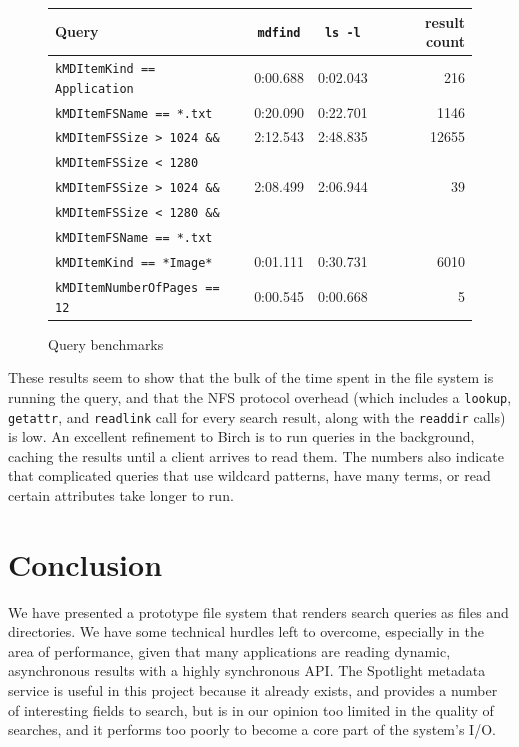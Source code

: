 \documentclass{article}
\begin{document}
\begin{figure}[ht!]
\begin{center}
\begin{tabular}{|l|c|c|r|} \hline
 \textbf{Query} & \texttt{mdfind}   & \texttt{ls -l} & \textbf{result count} \\ \hline \hline
\texttt{kMDItemKind == Application} & 0:00.688 & 0:02.043 &   216 \\ \hline
\texttt{kMDItemFSName == *.txt}     & 0:20.090 & 0:22.701 &  1146 \\ \hline
\texttt{kMDItemFSSize > 1024 \&\&}  & 2:12.543 & 2:48.835 & 12655 \\
\texttt{kMDItemFSSize < 1280}       &          &          &       \\ \hline
\texttt{kMDItemFSSize > 1024 \&\&}  & 2:08.499 & 2:06.944 &    39 \\
\texttt{kMDItemFSSize < 1280 \&\&}  &          &          &       \\ 
\texttt{kMDItemFSName == *.txt}     &          &          &       \\ \hline
\texttt{kMDItemKind == *Image*}     & 0:01.111 & 0:30.731 &  6010 \\ \hline
\texttt{kMDItemNumberOfPages == 12} & 0:00.545 & 0:00.668 &     5 \\ \hline
\end{tabular}
\caption{Query benchmarks}
\label{fig:benchmarks}
\end{center}
\end{figure}

These results seem to show that the bulk of the time spent in the file
system is running the query, and that the NFS protocol overhead (which
includes a \texttt{lookup}, \texttt{getattr}, and \texttt{readlink}
call for every search result, along with the \texttt{readdir} calls)
is low. An excellent refinement to Birch is to run queries in the
background, caching the results until a client arrives to read
them. The numbers also indicate that complicated queries that use
wildcard patterns, have many terms, or read certain attributes take
longer to run.

\section{Conclusion}

We have presented a prototype file system that renders search queries
as files and directories. We have some technical hurdles left to
overcome, especially in the area of performance, given that many
applications are reading dynamic, asynchronous results with a highly
synchronous API. The Spotlight metadata service is useful in this
project because it already exists, and provides a number of
interesting fields to search, but is in our opinion too limited in the
quality of searches, and it performs too poorly to become a core part
of the system's I/O.
\end{document}

